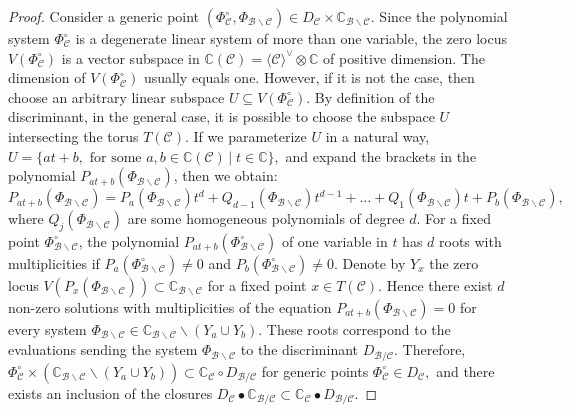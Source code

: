 \documentclass[11pt]{article}
\theoremstyle{plain}
\theoremstyle{definition}
\theoremstyle{remark}
\theoremstyle{plain}
\theoremstyle{plain}
\theoremstyle{plain}
\theoremstyle{definition}
\begin{document}
\begin{proof}
Consider a generic point $(\Phi_{\mathscr{C}}^{\circ},\Phi_{\mathscr{B}\backslash\mathscr{C}})\in D_{\mathscr{C}}\times\mathbb{C}_{\mathscr{B}\backslash\mathscr{C}}$.
Since the polynomial system $\Phi_{\mathscr{C}}^{\circ}$ is a degenerate
linear system of more than one variable, the zero locus $V(\Phi_{\mathscr{C}}^{\circ})$
is a vector subspace in $\mathbb{C}(\mathscr{C})=\langle\mathscr{C}\rangle^{\vee}\otimes\mathbb{C}$
of positive dimension. The dimension of $V(\Phi_{\mathscr{C}}^{\circ})$
usually equals one. However, if it is not the case, then choose an
arbitrary linear subspace $U\subseteq V(\Phi_{\mathscr{C}}^{\circ})$.
By definition of the discriminant, in the general case, it is possible
to choose the subspace $U$ intersecting the torus $T(\mathscr{C})$.
If we parameterize $U$ in a natural way, $U=\{at+b,\text{ for some }a,b\in\mathbb{C}(\mathscr{C})\,|\;t\in\mathbb{C}\},$
and expand the brackets in the polynomial $P_{at+b}(\Phi_{\mathscr{B}\backslash\mathscr{C}})$,
then we obtain:
\[
P_{at+b}(\Phi_{\mathscr{B}\backslash\mathscr{C}})=P_{a}(\Phi_{\mathscr{B}\backslash\mathscr{C}})t^{d}+Q_{d-1}(\Phi_{\mathscr{B}\backslash\mathscr{C}})t^{d-1}+...+Q_{1}(\Phi_{\mathscr{B}\backslash\mathscr{C}})t+P_{b}(\Phi_{\mathscr{B}\backslash\mathscr{C}}),
\]
where $Q_{j}(\Phi_{\mathscr{B}\backslash\mathscr{C}})$ are some homogeneous
polynomials of degree $d$. For a fixed point $\Phi_{\mathscr{B}\backslash\mathscr{C}}^{\circ}$,
the polynomial $P_{at+b}(\Phi_{\mathscr{B}\backslash\mathscr{C}}^{\circ})$
of one variable in $t$ has $d$ roots with multiplicities if $P_{a}(\Phi_{\mathscr{B}\backslash\mathscr{C}}^{\circ})\neq0$
and $P_{b}(\Phi_{\mathscr{B}\backslash\mathscr{C}}^{\circ})\neq0.$
Denote by $Y_{x}$ the zero locus $V(P_{x}(\Phi_{\mathscr{B}\backslash\mathscr{C}}))\subset\mathbb{C}_{\mathscr{B}\backslash\mathscr{C}}$
for a fixed point $x\in T(\mathscr{C}).$ Hence there exist $d$ non-zero
solutions with multiplicities of the equation $P_{at+b}(\Phi_{\mathscr{B}\backslash\mathscr{C}})=0$
for every system $\Phi_{\mathscr{B}\backslash\mathscr{C}}\in\mathbb{C}_{\mathscr{B}\backslash\mathscr{C}}\backslash(Y_{a}\cup Y_{b}).$
These roots correspond to the evaluations sending the system $\Phi_{\mathscr{B}\backslash\mathscr{C}}$
to the discriminant $D_{\mathscr{B}/\mathscr{C}}$. Therefore, $\Phi_{\mathscr{C}}^{\circ}\times(\mathbb{C}_{\mathscr{B}\backslash\mathscr{C}}\backslash(Y_{a}\cup Y_{b}))\subset\mathbb{C}_{\mathscr{C}}\circ D_{\mathscr{B}/\mathscr{C}}$
for generic points $\Phi_{\mathscr{C}}^{\circ}\in D_{\mathscr{C}},$
and there exists an inclusion of the closures $D_{\mathscr{C}}\bullet\mathbb{C}_{\mathscr{B}/\mathscr{C}}\subset\mathbb{C}_{\mathscr{C}}\bullet D_{\mathscr{B}/\mathscr{C}}.$
\end{proof}
\end{document}
